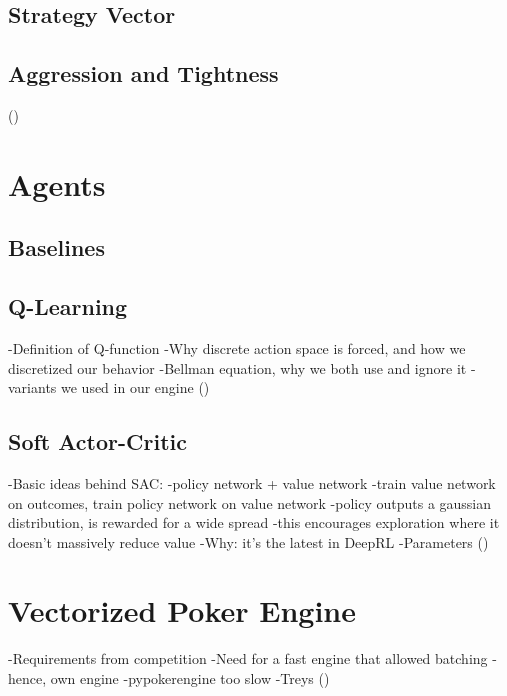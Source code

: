 \subsection{Strategy Vector}

\subsection{Aggression and Tightness}
(\cite{PokerStrategy})



\section{Agents}

\subsection{Baselines}



\subsection{Q-Learning}
-Definition of Q-function
-Why discrete action space is forced, and how we discretized our behavior
-Bellman equation, why we both use and ignore it
-variants we used in our engine
(\cite{SpinningUp2018})

\subsection{Soft Actor-Critic}
\cite{SAC_main}
-Basic ideas behind SAC:
    -policy network + value network
    -train value network on outcomes, train policy network on value network
    -policy outputs a gaussian distribution, is rewarded for a wide spread
    -this encourages exploration where it doesn't massively reduce value
-Why: it's the latest in DeepRL
-Parameters
(\cite{SpinningUp2018})


\section{Vectorized Poker Engine}
-Requirements from competition
-Need for a fast engine that allowed batching
    -hence, own engine
-pypokerengine too slow
-Treys (\cite{Treys})